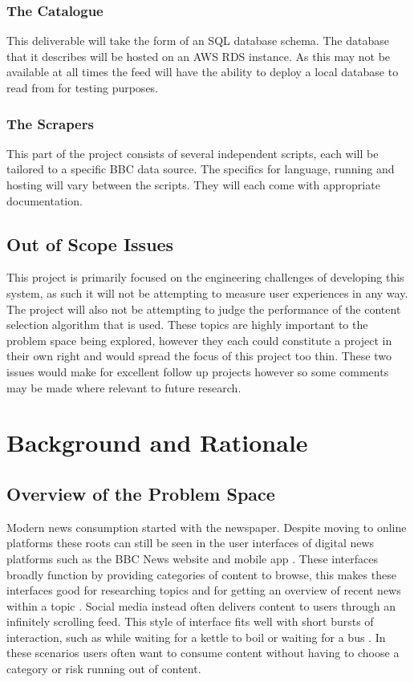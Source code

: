\documentclass[12pt,titlepage]{article}
\begin{document}
    \subsubsection{The Catalogue}

    This deliverable will take the form of an SQL database schema. The database
    that it describes will be hosted on an AWS RDS instance. As this may not be
    available at all times the feed will have the ability to deploy a local
    database to read from for testing purposes.

    \subsubsection{The Scrapers}

    This part of the project consists of several independent scripts, each will
    be tailored to a specific BBC data source. The specifics for language,
    running and hosting will vary between the scripts. They will each come with
    appropriate documentation.

  \subsection{Out of Scope Issues}

  This project is primarily focused on the engineering challenges of developing
  this system, as such it will not be attempting to measure user experiences in
  any way. The project will also not be attempting to judge the performance of
  the content selection algorithm that is used. These topics are highly
  important to the problem space being explored, however they each could
  constitute a project in their own right and would spread the focus of this
  project too thin. These two issues would make for excellent follow up projects
  however so some comments may be made where relevant to future research.

\section{Background and Rationale}

  \subsection{Overview of the Problem Space}

  Modern news consumption started with the newspaper. Despite moving to online
  platforms these roots can still be seen in the user interfaces of digital news
  platforms such as the BBC News website and mobile app \cite{ofcom}. These
  interfaces broadly function by providing categories of content to browse, this
  makes these interfaces good for researching topics and for getting an overview
  of recent news within a topic \cite{yalanska_2021}. Social media instead often
  delivers content to users through an infinitely scrolling feed. This style of
  interface fits well with short bursts of interaction, such as while waiting
  for a kettle to boil or waiting for a bus \cite{yalanska_2020}. In these
  scenarios users often want to consume content without having to choose a
  category or risk running out of content.
\end{document}
